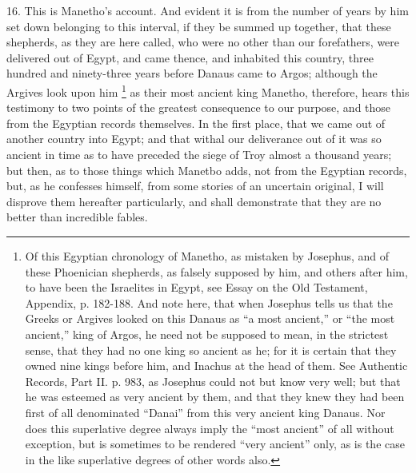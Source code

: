 16. This is Manetho's account. And evident it is from the number of years
by him set down belonging to this interval, if they be summed up together,
that these shepherds, as they are here called, who were no other than our
forefathers, were delivered out of Egypt, and came thence, and inhabited
this country, three hundred and ninety-three years before Danaus came to
Argos; although the Argives look upon him \footnote{Of this Egyptian
chronology of Manetho, as mistaken by Josephus, and of these Phoenician
shepherds, as falsely supposed by him, and others after him, to have been
the Israelites in Egypt, see Essay on the Old Testament, Appendix, p.
182-188. And note here, that when Josephus tells us that the Greeks or
Argives looked on this Danaus as ``a most ancient,'' or ``the most ancient,''
king of Argos, he need not be supposed to mean, in the strictest sense,
that they had no one king so ancient as he; for it is certain that they
owned nine kings before him, and Inachus at the head of them. See
Authentic Records, Part II. p. 983, as Josephus could not but know very
well; but that he was esteemed as very ancient by them, and that they knew
they had been first of all denominated ``Danai'' from this very ancient king
Danaus. Nor does this superlative degree always imply the ``most ancient''
of all without exception, but is sometimes to be rendered ``very ancient''
only, as is the case in the like superlative degrees of other words also.} as their
most ancient king Manetho, therefore, hears this testimony to two points
of the greatest consequence to our purpose, and those from the Egyptian
records themselves. In the first place, that we came out of another
country into Egypt; and that withal our deliverance out of it was so
ancient in time as to have preceded the siege of Troy almost a thousand
years; but then, as to those things which Manetbo adds, not from the
Egyptian records, but, as he confesses himself, from some stories of an
uncertain original, I will disprove them hereafter particularly, and shall
demonstrate that they are no better than incredible fables.

